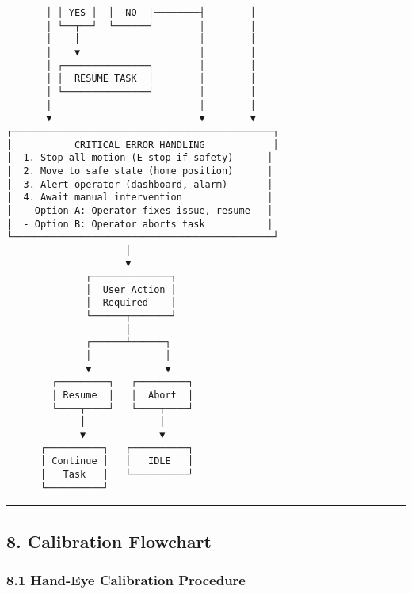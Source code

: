 \documentclass[
]{article}
\begin{document}
\begin{verbatim}
       │ │ YES │  │  NO  │────────┤        │
       │ └──┬──┘  └──────┘        │        │
       │    │                     │        │
       │    ▼                     │        │
       │ ┌───────────────┐        │        │
       │ │  RESUME TASK  │        │        │
       │ └───────────────┘        │        │
       │                          │        │
       ▼                          ▼        ▼
┌──────────────────────────────────────────────┐
│           CRITICAL ERROR HANDLING            │
│  1. Stop all motion (E-stop if safety)      │
│  2. Move to safe state (home position)      │
│  3. Alert operator (dashboard, alarm)       │
│  4. Await manual intervention               │
│  - Option A: Operator fixes issue, resume   │
│  - Option B: Operator aborts task           │
└──────────────────────────────────────────────┘
                     │
                     ▼
              ┌──────────────┐
              │  User Action │
              │  Required    │
              └──────┬───────┘
                     │
              ┌──────┴──────┐
              │             │
              ▼             ▼
        ┌─────────┐   ┌─────────┐
        │ Resume  │   │  Abort  │
        └────┬────┘   └────┬────┘
             │             │
             ▼             ▼
      ┌──────────┐   ┌──────────┐
      │ Continue │   │   IDLE   │
      │   Task   │   └──────────┘
      └──────────┘
\end{verbatim}

\begin{center}\rule{0.5\linewidth}{0.5pt}\end{center}

\hypertarget{calibration-flowchart}{%
\subsection{8. Calibration Flowchart}\label{calibration-flowchart}}

\hypertarget{hand-eye-calibration-procedure}{%
\subsubsection{8.1 Hand-Eye Calibration
Procedure}\label{hand-eye-calibration-procedure}}
\end{document}
